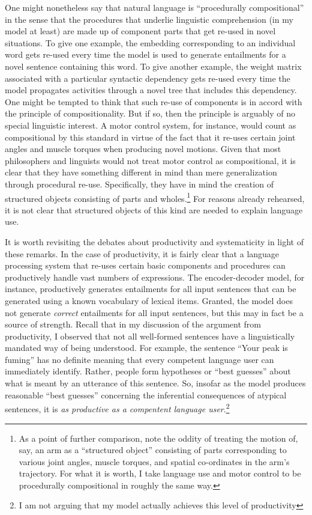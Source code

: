 One might nonetheless say that natural language is ``procedurally compositional'' in the sense that the procedures that underlie linguistic comprehension (in my model at least) are made up of component parts that get re-used in novel situations. To give one example, the embedding corresponding to an individual word gets re-used every time the model is used to generate entailments for a novel sentence containing this word. To give another example, the weight matrix associated with a particular syntactic dependency gets re-used every time the model propagates activities through a novel tree that includes this dependency. One might be tempted to think that such re-use of components is in accord with the principle of compositionality. But if so, then the principle is arguably of no special linguistic interest. A motor control system, for instance, would count as compositional by this standard in virtue of the fact that it re-uses certain joint angles and muscle torques when producing novel motions. Given that most philosophers and linguists would not treat motor control as compositional, it is clear that they have something different in mind than mere generalization through procedural re-use. Specifically, they have in mind the creation of structured objects consisting of parts and wholes.\footnote{As a point of further comparison, note the oddity of treating the motion of, say, an arm as a ``structured object'' consisting of parts corresponding to various joint angles, muscle torques, and spatial co-ordinates in the arm's trajectory. For what it is worth, I take language use and motor control to be procedurally compositional in roughly the same way.} For reasons already rehearsed, it is not clear that structured objects of this kind are needed to explain language use.

It is worth revisiting the debates about productivity and systematicity in light of these remarks. In the case of productivity, it is fairly clear that a language processing system that re-uses certain basic components and procedures can productively handle vast numbers of expressions. The encoder-decoder model, for instance, productively generates entailments for all input sentences that can be generated using a known vocabulary of lexical items. Granted, the model does not generate \textit{correct} entailments for all input sentences, but this may in fact be a source of strength. Recall that in my discussion of the argument from productivity, I observed that not all well-formed sentences have a linguistically mandated way of being understood. For example, the sentence ``Your peak is fuming'' has no definite meaning that every competent language user can immediately identify. Rather, people form hypotheses or ``best guesses'' about what is meant by an utterance of this sentence. So, insofar as the model produces reasonable ``best guesses'' concerning the inferential consequences of atypical sentences, it is \textit{as productive as a compentent language user}.\footnote{I am not arguing that my model actually achieves this level of productivity}

